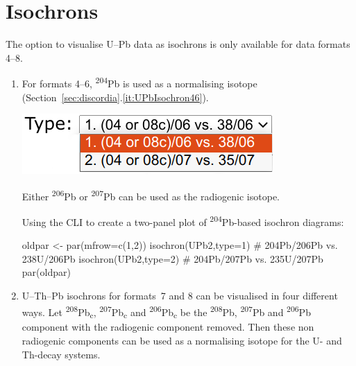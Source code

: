 \begin{refsection}
\begin{enumerate}
\end{enumerate}

\section{Isochrons} \label{sec:UPb-isochron-R}

The option to visualise U--Pb data as isochrons is only available for
data formats 4--8.

\begin{enumerate}

\item For formats 4--6, \textsuperscript{204}Pb is used as a
  normalising isotope
  (Section~\ref{sec:discordia}.\ref{it:UPbIsochron46}).

\noindent\begin{minipage}[t]{.3\linewidth}
\strut\vspace*{-\baselineskip}\newline
\includegraphics[width=\linewidth]{../figures/UPbIsochron.png}
\end{minipage}
\begin{minipage}[t]{.7\linewidth}
Either \textsuperscript{206}Pb or \textsuperscript{207}Pb can be used
as the radiogenic isotope.
\end{minipage}

\noindent Using the CLI to create a two-panel plot of
\textsuperscript{204}Pb-based isochron diagrams:
\begin{script}
oldpar <- par(mfrow=c(1,2))
isochron(UPb2,type=1) # 204Pb/206Pb vs. 238U/206Pb
isochron(UPb2,type=2) # 204Pb/207Pb vs. 235U/207Pb
par(oldpar)
\end{script}

\item U--Th--Pb isochrons for formats~7 and 8 can be visualised in
  four different ways. Let \textsuperscript{208}Pb\textsubscript{c},
  \textsuperscript{207}Pb\textsubscript{c} and
  \textsuperscript{206}Pb\textsubscript{c} be the
  \textsuperscript{208}Pb, \textsuperscript{207}Pb and
  \textsuperscript{206}Pb component with the radiogenic component
  removed. Then these non radiogenic components can be used as a
  normalising isotope for the U- and Th-decay systems.


\end{enumerate}
\end{refsection}
